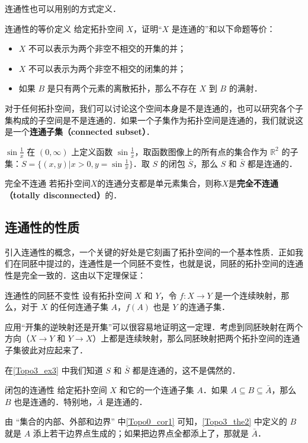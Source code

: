 连通性也可以用别的方式定义．

\begin{exercise}{连通性的等价定义}\label{Topo3_exe1}
给定拓扑空间 $X$，证明“$X$ 是连通的”和以下命题等价：
\begin{itemize}
\item $X$ 不可以表示为两个非空不相交的开集的并；
\item $X$ 不可以表示为两个非空不相交的闭集的并；
\item 如果 $B$ 是只有两个元素的离散拓扑，那么不存在 $X$ 到 $B$ 的满射．

\end{itemize}
\end{exercise}

对于任何拓扑空间，我们可以讨论这个空间本身是不是连通的，也可以研究各个子集构成的子空间是不是连通的．如果一个子集作为拓扑空间是连通的，我们就说这是一个\textbf{连通子集（connected subset）}．

\begin{example}{$\sin{\frac{1}{x}}$}\label{Topo3_ex3}
在 $(0,\infty)$ 上定义函数 $\sin{\frac{1}{x}}$，取函数图像上的所有点的集合作为 $\mathbb{R}^2$ 的子集：$S=\{(x, y)|x>0, y=\sin{\frac{1}{x}}\}$．取 $S$ 的闭包 $\bar{S}$，那么 $S$ 和 $\bar{S}$ 都是连通的．
\end{example}


\begin{definition}{完全不连通}
若拓扑空间$X$的连通分支都是单元素集合，则称$X$是\textbf{完全不连通（totally disconnected）}的．
\end{definition}








\subsection{连通性的性质}

引入连通性的概念，一个关键的好处是它刻画了拓扑空间的一个基本性质．正如我们在同胚中提过的，连通性是一个同胚不变性，也就是说，同胚的拓扑空间的连通性是完全一致的．这由以下定理保证：

\begin{theorem}{连通性的同胚不变性}\label{Topo3_the1}
设有拓扑空间 $X$ 和 $Y$，令 $f:X\rightarrow Y$ 是一个连续映射，那么，对于 $X$ 的任何连通子集 $A$，$f(A)$ 也是 $Y$ 的连通子集．
\end{theorem}

应用“开集的逆映射还是开集”可以很容易地证明这一定理．考虑到同胚映射在两个方向（$X\rightarrow Y$ 和 $Y\rightarrow X$）上都是连续映射，那么同胚映射把两个拓扑空间的连通子集彼此对应起来了．

在\autoref{Topo3_ex3} 中我们知道 $S$ 和 $\bar{S}$ 都是连通的，这不是偶然的．

\begin{theorem}{闭包的连通性}\label{Topo3_the2}
给定拓扑空间 $X$ 和它的一个连通子集 $A$．如果 $A\subseteq B\subseteq\bar{A}$，那么 $B$ 也是连通的．特别地，$\bar{A}$ 是连通的．
\end{theorem}

由 “集合的内部、外部和边界” 中\autoref{Topo0_cor1} 可知，\autoref{Topo3_the2} 中定义的 $B$ 就是 $A$ 添上若干边界点生成的；如果把边界点全都添上了，那就是 $\bar{A}$．